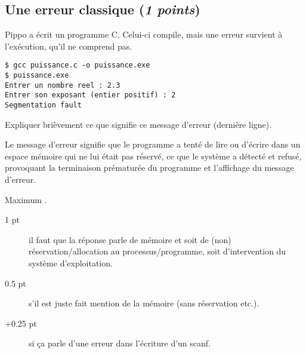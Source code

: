 \subsection{Une erreur classique (\emph{1 points})} 

Pippo a écrit un programme C. Celui-ci compile, mais une erreur
survient à l'exécution, qu'il ne comprend pas.

\begin{verbatim}
$ gcc puissance.c -o puissance.exe
$ puissance.exe
Entrer un nombre reel : 2.3
Entrer son exposant (entier positif) : 2
Segmentation fault
\end{verbatim}
\question
Expliquer brièvement ce que signifie ce message d'erreur (dernière ligne).
\begin{correction}
Le message d'erreur  signifie que le programme a tenté de lire ou d'écrire dans un espace mémoire qui ne lui était pas réservé, ce que le système a détecté et refusé, provoquant la terminaison prématurée du programme et l'affichage du message d'erreur. 

\begin{baremeenv}
Maximum .
 \begin{description}
    \item[1 pt] il faut que la réponse parle de mémoire et soit de
      (non) réservation/allocation au processus/programme, soit
      d'intervention du système d'exploitation.
    \item[0.5 pt] s'il est juste fait mention de la mémoire (sans
      réservation etc.).
    \item[+0.25 pt] si ça parle d'une erreur dans l'écriture d'un scanf.
  \end{description}
\end{baremeenv}
\end{correction}



